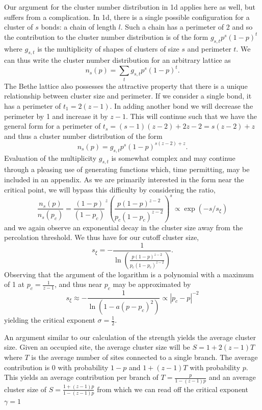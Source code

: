 Our argument for the cluster number distribution in 1d applies here as well,
but suffers from a complication.  In 1d, there is a single possible
configuration for a cluster of $s$ bonds: a chain of length $l$.  Such a chain
has a perimeter of 2 and so the contribution to the cluster number
distribution is of the form $g_{s,t}p^s(1-p)^t$ where $g_{s,t}$ is the
multiplicity of shapes of clusters of size $s$ and perimeter $t$.  We can
thus write the cluster number distribution for an arbitrary lattice as
\[n_s(p) = \sum_t g_{s,t}p^s(1-p)^t.\]
The Bethe lattice also possesses the attractive property that there is a unique
relationship between cluster size and perimeter.  If we consider a single bond,
it has a perimeter of $t_1 = 2(z-1)$.  In adding another bond we will decrease
the perimeter by 1 and increase it by $z-1$.  This will continue such that we
have the general form for a perimeter of $t_s = (s-1)(z-2) + 2z-2 = s(z-2) +z$ and thus a cluster
number distribution of the form
\[n_s(p) = g_{s,t}p^s(1-p)^{s(z-2) + z}.\]
Evaluation of the multiplicity $g_{s,t}$ is somewhat complex and may continue
through a pleasing use
of generating functions \cite{Fisher1961} which, time permitting, may be included
in an appendix. As we are primarily interested in the form near
the critical point, we will bypass this difficulty by considering the ratio,
\[\frac{n_s(p)}{n_s(p_c)} = \frac{(1-p)}{(1-p_c)}^{z}
\left(\frac{p(1-p)^{{z-2}}}{p_c(1-p_c)^{{z-2}}}\right)^s\propto \exp{(-s/s_\xi)}
\]
and we again observe an exponential decay in the cluster size away from the
percolation threshold.  We thus have for our cutoff cluster size,
\[s_\xi = -\frac{1}{\ln{\left(\frac{p(1-p)^{z-2}}{p_c(1-p_c)^{z-2}}\right)}}.\]
Observing that the argument of the logarithm is a polynomial with a maximum of 1
at $p_c = \frac{1}{z-1}$, and thus near $p_c$ may be approximated by
\[s_\xi \approx -\frac{1}{\ln{\left(1 - a(p - p_c)^2 \right)}}\propto |p_c - p|^{-2}\]
yielding the critical exponent $\sigma = \frac{1}{2}$.

An argument similar to our calculation of the strength yields the average cluster
size.  Given an occupied site, the average cluster size will be $S = 1 + 2(z-1)T$
where $T$ is the average number of sites connected to a single branch.  The 
average contribution is 0 with probability $1-p$ and $1 + (z-1)T$ with probability
$p$.  This yields an average contribution per branch of $T = \frac{p}{1-(z-1)p}$
and an average cluster size of $S = \frac{1 + (z-1)p}{1-(z-1)p}$ from which we
can read off the critical exponent $\gamma=1$

